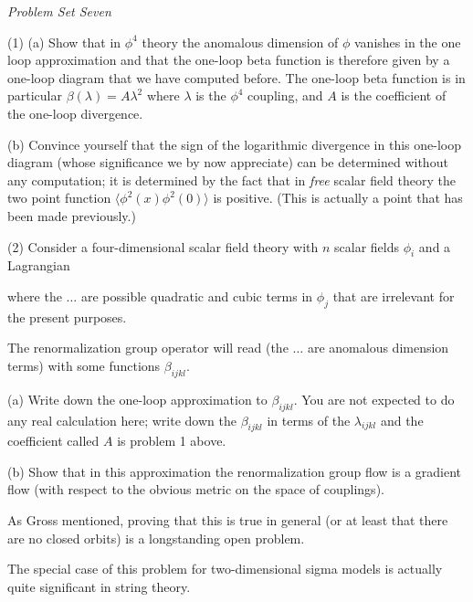 
%


{\it Problem Set Seven}

(1) (a) Show that in $\phi^4$ theory the anomalous dimension of $\phi$ vanishes
in the one loop approximation and that the one-loop beta function is therefore
given by a one-loop diagram that we have computed before.  The one-loop
beta function is in particular $\beta(\lambda)=A\lambda^2$ where $\lambda$ is
the $\phi^4$ coupling, and $A$ is the coefficient of the one-loop divergence.

(b) Convince yourself that the sign of the logarithmic divergence in this
one-loop diagram (whose significance we by now appreciate) can be determined
without any computation; it is determined by the fact that in {\it free}
scalar field theory the two point function $\langle \phi^2(x)\phi^2(0)\rangle$
is positive.  (This is actually a point that has been made previously.)


(2) Consider a four-dimensional
scalar field theory with $n$ scalar fields $\phi_i$ and
a Lagrangian

\eqn{}
where 
the $\dots$ are possible quadratic and cubic terms in $\phi_j$ that are
irrelevant for the present purposes.

 The renormalization group operator will read
\eqn{}
(the $\dots$ are anomalous dimension terms) 
with some functions $\beta_{ijkl}$.

(a) Write down the one-loop approximation to $\beta_{ijkl}$.
You are not expected to do any real calculation here;   write down
the $\beta_{ijkl}$ in terms of the $\lambda_{ijkl}$ and the coefficient
called $A$ is problem 1 above.  

(b) Show that in this approximation the renormalization group flow
\eqn{}
is a gradient flow (with respect to the obvious metric on the space of 
couplings).

As Gross mentioned, proving that this is true in general (or at least
that  there are no closed orbits) is a longstanding open problem.

The special case of this problem for two-dimensional sigma models
is actually quite significant in string theory.  

